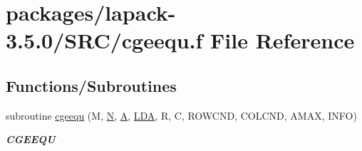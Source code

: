 \hypertarget{cgeequ_8f}{}\section{packages/lapack-\/3.5.0/\+S\+R\+C/cgeequ.f File Reference}
\label{cgeequ_8f}
\subsection*{Functions/\+Subroutines}
\begin{DoxyCompactItemize}
\item 
subroutine \hyperlink{group__complexGEcomputational_ga5f98777e93c2142155328be608e4962d}{cgeequ} (M, \hyperlink{polmisc_8c_a0240ac851181b84ac374872dc5434ee4}{N}, \hyperlink{classA}{A}, \hyperlink{example__user_8c_ae946da542ce0db94dced19b2ecefd1aa}{L\+D\+A}, R, C, R\+O\+W\+C\+N\+D, C\+O\+L\+C\+N\+D, A\+M\+A\+X, I\+N\+F\+O)
\begin{DoxyCompactList}\small\item\em {\bfseries C\+G\+E\+E\+Q\+U} \end{DoxyCompactList}\end{DoxyCompactItemize}
